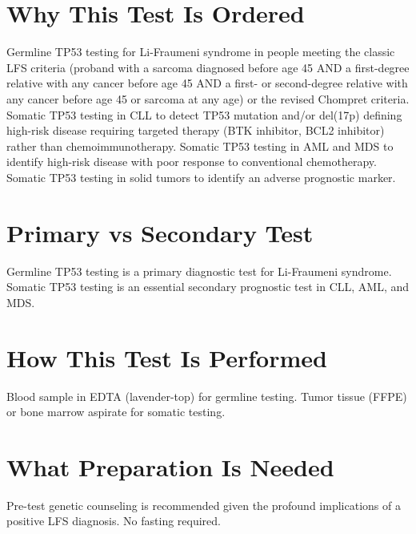 \section*{Why This Test Is Ordered}
Germline TP53 testing for Li-Fraumeni syndrome in people meeting the classic LFS criteria (proband with a sarcoma diagnosed before age 45 AND a first-degree relative with any cancer before age 45 AND a first- or second-degree relative with any cancer before age 45 or sarcoma at any age) or the revised Chompret criteria. Somatic TP53 testing in CLL to detect TP53 mutation and/or del(17p) defining high-risk disease requiring targeted therapy (BTK inhibitor, BCL2 inhibitor) rather than chemoimmunotherapy. Somatic TP53 testing in AML and MDS to identify high-risk disease with poor response to conventional chemotherapy. Somatic TP53 testing in solid tumors to identify an adverse prognostic marker.

\section*{Primary vs Secondary Test}
Germline TP53 testing is a primary diagnostic test for Li-Fraumeni syndrome. Somatic TP53 testing is an essential secondary prognostic test in CLL, AML, and MDS.

\section*{How This Test Is Performed}
Blood sample in EDTA (lavender-top) for germline testing. Tumor tissue (FFPE) or bone marrow aspirate for somatic testing.

\section*{What Preparation Is Needed}
Pre-test genetic counseling is recommended given the profound implications of a positive LFS diagnosis. No fasting required.

